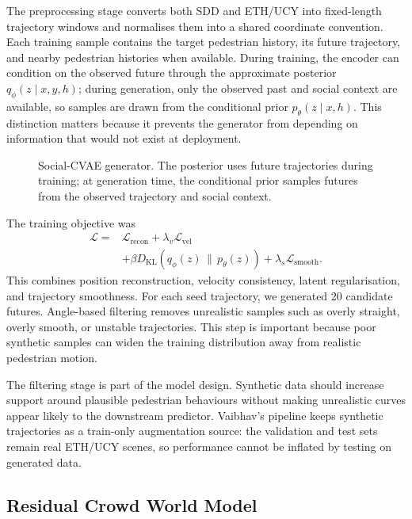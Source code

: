 \documentclass[conference]{IEEEtran}
\begin{document}
The preprocessing stage converts both SDD and ETH/UCY into fixed-length
trajectory windows and normalises them into a shared coordinate convention. Each
training sample contains the target pedestrian history, its future trajectory,
and nearby pedestrian histories when available. During training, the encoder can
condition on the observed future through the approximate posterior
$q_\phi(z\mid x,y,h)$; during generation, only the observed past and social
context are available, so samples are drawn from the conditional prior
$p_\theta(z\mid x,h)$. This distinction matters because it prevents the
generator from depending on information that would not exist at deployment.

\begin{figure}[t]
  \centering
  \resizebox{0.82\columnwidth}{!}{}
  \caption{Social-CVAE generator. The posterior uses future trajectories during
  training; at generation time, the conditional prior samples futures from the
  observed trajectory and social context.}
  \label{fig:cvae}
\end{figure}

The training objective was
\begin{equation}
\begin{split}
\mathcal{L} =
&\mathcal{L}_{\text{recon}}
+ \lambda_v \mathcal{L}_{\text{vel}} \\
&+ \beta D_{\text{KL}}(q_\phi(z)\,\|\,p_\theta(z))
+ \lambda_s \mathcal{L}_{\text{smooth}} .
\end{split}
\end{equation}
This combines position reconstruction, velocity consistency, latent
regularisation, and trajectory smoothness. For each seed trajectory, we
generated 20 candidate futures. Angle-based filtering removes
unrealistic samples such as overly straight, overly smooth, or unstable
trajectories. This step is important because poor synthetic samples can widen
the training distribution away from realistic pedestrian motion.

The filtering stage is part of the model design. Synthetic data should increase
support around plausible pedestrian behaviours without making unrealistic
curves appear likely to the downstream predictor. Vaibhav's pipeline keeps
synthetic trajectories as a train-only augmentation source: the validation and
test sets remain real ETH/UCY scenes, so performance cannot be inflated by
testing on generated data.

\subsection{Residual Crowd World Model}
\end{document}
